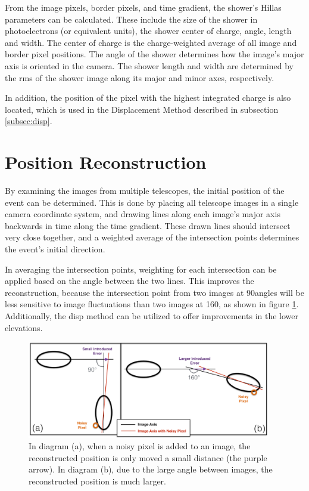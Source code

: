 From the image pixels, border pixels, and time gradient, the shower's Hillas parameters can be calculated.
These include the size of the shower in photoelectrons (or equivalent units), the shower center of charge, angle, length and width.
The center of charge is the charge-weighted average of all image and border pixel positions.
The angle of the shower determines how the image's major axis is oriented in the camera.
The shower length and width are determined by the rms of the shower image along its major and minor axes, respectively.

In addition, the position of the pixel with the highest integrated charge is also located, which is used in the Displacement Method described in subsection \ref{subsec:disp}.

\section{Position Reconstruction}\label{subsec:posrecon}
By examining the images from multiple telescopes, the initial position of the event can be determined.
This is done by placing all telescope images in a single camera coordinate system, and drawing lines along each image's major axis backwards in time along the time gradient.
These drawn lines should intersect very close together, and a weighted average of the intersection points determines the event's initial direction.

In averaging the intersection points, weighting for each intersection can be applied based on the angle between the two lines.
This improves the reconstruction, because the intersection point from two images at 90\degree angles will be less sensitive to image fluctuations than two images at 160\degree, as shown in figure \ref{fig:largeintersectangle}.
Additionally, the disp method can be utilized to offer improvements in the lower elevations.

\begin{figure}[ht]
  \begin{center}
    \includegraphics[width=0.95\textwidth]{images/large_angle_image_intersection_error_cropped.eps}
    \caption[Large Image Intersection Angles]{In diagram (a), when a noisy pixel is added to an image, the reconstructed position is only moved a small distance (the purple arrow).  In diagram (b), due to the large angle between images, the reconstructed position is much larger.}\label{fig:largeintersectangle}
  \end{center}
\end{figure}


